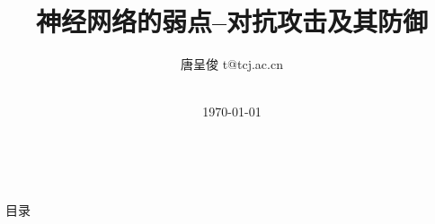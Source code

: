 \documentclass[UTF8, aspectratio=169, 10pt, t]{ctexbeamer}
\begin{document}
	


\newcommand{\balA}[1][1]{BAL$^\mathup{I}_{#1:#1}$\xspace}
\newcommand{\unbalA}[1][n]{UNBAL$^\mathup{I}_{1:#1}$\xspace}
\newcommand{\balB}[1][1]{BAL$^\mathup{II}_{#1:#1}$\xspace}
\newcommand{\unbalB}[1][n]{UNBAL$^\mathup{II}_{#1:1}$\xspace}



\title{神经网络的弱点--对抗攻击及其防御
}

\author[唐呈俊]{%
	唐呈俊 t@tcj.ac.cn
} %


\date{%
	\\[\medskipamount]
	\textmd{\today}%
}






\begin{frame}[standout]{~}
	
	\titlepage%
	
\end{frame}

%	
%	


\begin{frame}{目录}
	\vspace{-1em}
	\tableofcontents[hideallsubsections]
\end{frame}	
\end{document}
